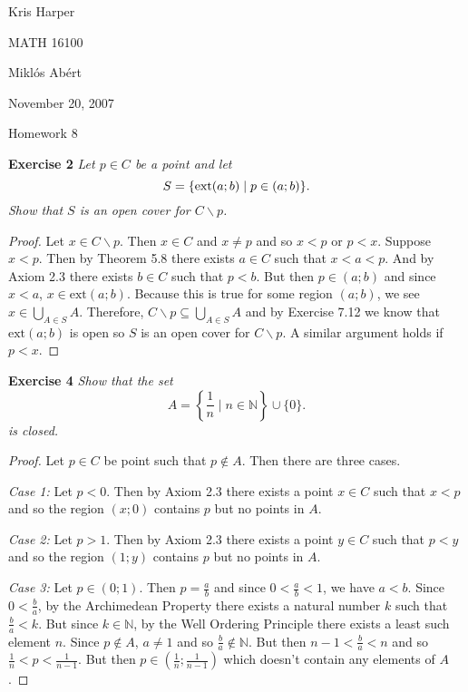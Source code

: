 \documentclass{article}
\begin{document}
\begin{flushright}
Kris Harper

MATH 16100

Mikl\'{o}s Ab\'{e}rt

November 20, 2007
\end{flushright}

\begin{center}
Homework 8
\end{center}

\begin{flushleft}

\textbf{Exercise 2}
\textsl{Let $p \in C$ be a point and let
\[
S = \{\textup{ext}(a;b) \mid p \in (a;b)\}.
\]
Show that $S$ is an open cover for $C \backslash p$.}
\begin{proof}
Let $x \in C \backslash p$. Then $x \in C$ and $x \neq p$ and so $x<p$ or $p<x$. Suppose $x<p$. Then by Theorem 5.8 there exists $a \in C$ such that $x<a<p$. And by Axiom 2.3 there exists $b \in C$ such that $p<b$. But then $p \in (a;b)$ and since $x < a$, $x \in \text{ext}(a;b)$. Because this is true for some region $(a;b)$, we see $x \in \bigcup_{A \in S} A$. Therefore, $C \backslash p \subseteq \bigcup_{A \in S} A$ and by Exercise 7.12 we know that $\text{ext}(a;b)$ is open so $S$ is an open cover for $C \backslash p$. A similar argument holds if $p < x$.
\end{proof}

\textbf{Exercise 4}
\textsl{Show that the set
\[
A = \left\{ \frac{1}{n} \mid n \in \mathbb{N} \right\} \cup \{0\}.
\]
is closed.}
\begin{proof}
Let $p \in C$ be point such that $p \notin A$. Then there are three cases.\newline

\textit{Case 1:} Let $p<0$. Then by Axiom 2.3 there exists a point $x \in C$ such that $x<p$ and so the region $(x;0)$ contains $p$ but no points in $A$.\newline

\textit{Case 2:} Let $p>1$. Then by Axiom 2.3 there exists a point $y \in C$ such that $p<y$ and so the region $(1;y)$ contains $p$ but no points in $A$.\newline

\textit{Case 3:} Let $p \in (0;1)$. Then $p=\frac{a}{b}$ and since $0 < \frac{a}{b} < 1$, we have $a<b$. Since $0<\frac{b}{a}$, by the Archimedean Property there exists a natural number $k$ such that $\frac{b}{a} < k$. But since $k \in \mathbb{N}$, by the Well Ordering Principle there exists a least such element $n$. Since $p \notin A$, $a \neq 1$ and so $\frac{b}{a} \notin \mathbb{N}$. But then $n-1 < \frac{b}{a} < n$ and so $\frac{1}{n}<p<\frac{1}{n-1}$. But then $p \in \left( \frac{1}{n};\frac{1}{n-1} \right)$ which doesn't contain any elements of $A$.\newline


\end{proof}
\end{flushleft}
\end{document}
